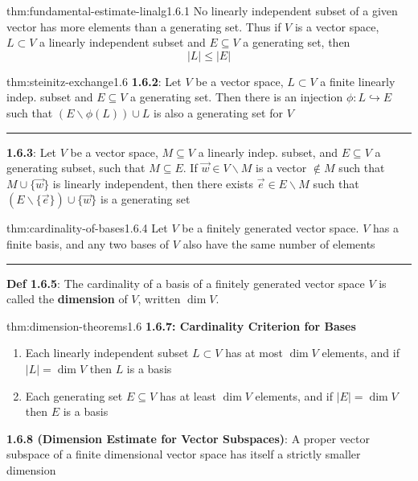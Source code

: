 \documentclass[landscape, 8pt]{extarticle}
\begin{document}
\begin{multicols}{3}
\begin{thm}{thm:fundamental-estimate-linalg}{1.6.1}
    No linearly independent subset of a given vector has more elements than a generating set. Thus if $V$ is a vector space, $L \subset V$ a linearly independent subset and $E \subseteq V$ a generating set, then
    \[\lvert L \rvert \le \lvert E \rvert\]
\end{thm} 

\begin{thm}{thm:steinitz-exchange}{1.6}
    \textbf{1.6.2}: Let $V$ be a vector space, $L \subset V$ a finite linearly indep. subset and $E \subseteq V$ a generating set. Then there is an injection $\phi : L \hookrightarrow E$ such that $(E \backslash \phi(L)) \cup L$ is also a generating set for $V$
    
    \vspace{-5pt}
    \noindent\rule{\textwidth}{0.2pt}
    \textbf{1.6.3}: Let $V$ be a vector space, $M \subseteq V$ a linearly indep. subset, and $E \subseteq V$ a generating subset, such that $M \subseteq E$. If $\vec{w}\in V\backslash M$ is a vector $\not\in M$ such that $M \cup \{ \vec{w}\}$ is linearly independent, then there exists $\vec{e}\in E \backslash M$ such that $(E \backslash \{\vec{e}\}) \cup \{\vec{w}\}$ is a generating set
\end{thm}
\newpage


\begin{thm}{thm:cardinality-of-bases}{1.6.4}
    Let $V$ be a finitely generated vector space. $V$ has a finite basis, and any two bases of $V$ also have the same number of elements

    \noindent\rule{\textwidth}{0.2pt}
    \textbf{Def 1.6.5}: The cardinality of a basis of a finitely generated vector space $V$ is called the \textbf{dimension} of $V$, written $\dim V$. 
\end{thm}

\begin{thm}{thm:dimension-theorems}{1.6}
    \textbf{1.6.7: Cardinality Criterion for Bases}
    \vspace{-5pt}
    \begin{enumerate}
        \setlength\itemsep{0em}
        \item Each linearly independent subset $L \subset V$ has at most $\dim V$ elements, and if $\lvert L \rvert = \dim V$ then $L$ is a basis
        \vspace{-3pt}
        \item Each generating set $E \subseteq V$ has at least $\dim V$ elements, and if $\lvert E \rvert = \dim V$ then $E$ is a basis
    \end{enumerate}
    \textbf{1.6.8 (Dimension Estimate for Vector Subspaces)}: A proper vector subspace of a finite dimensional vector space has itself a strictly smaller dimension


\end{thm}
\end{multicols}
\end{document}
